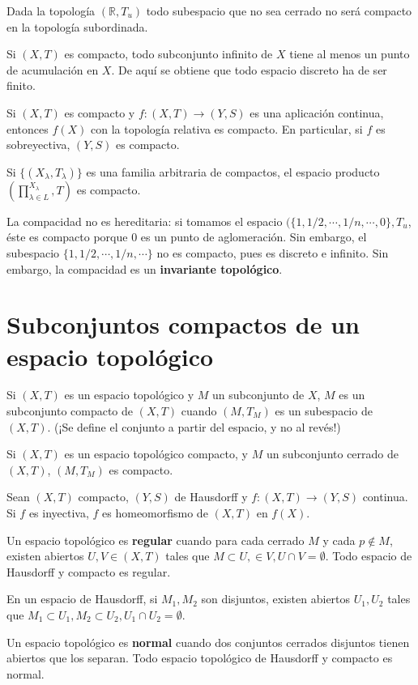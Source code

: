 \documentclass[a4paper, 11pt]{extarticle}
\begin{document}
Dada la topología \((\mathbb{R}, T_u)\) todo subespacio que no sea cerrado no
será compacto en la topología subordinada.

Si \((X,T)\) es compacto, todo subconjunto infinito de \(X\) tiene al menos
un punto de acumulación en \(X\). De aquí se obtiene que todo espacio discreto
ha de ser finito.

Si \((X,T)\) es compacto y \(f:  (X,T) \rightarrow  (Y, S)\) es una
aplicación continua, entonces \(f(X)\) con la topología relativa es compacto.
En particular, si \(f\) es sobreyectiva, \((Y,S)\) es compacto.

Si \(\{ (X_\lambda, T_\lambda) \}\) es una familia arbitraria de compactos, el
espacio producto \((\prod_{\lambda \in L}^{X_\lambda}, T)\) es compacto. 

La compacidad no es hereditaria: si tomamos el espacio \((\{ 1, 1/2, \cdots, 1/n,
\cdots, 0 \},T_u\), éste es compacto porque 0 es un punto de aglomeración. Sin
embargo, el subespacio \(\{ 1, 1/2, \cdots, 1/n, \cdots \}\) no es compacto,
pues es discreto e infinito. Sin embargo, la compacidad es un \textbf{invariante topológico}.

\section{Subconjuntos compactos de un espacio topológico}
\label{sec:orgcd52420}
Si \((X,T)\) es un espacio topológico y \(M\) un subconjunto de \(X\), \(M\) es un subconjunto compacto de \((X,T)\) cuando \((M, T_M)\) es un
subespacio de \((X,T)\). (¡Se define el conjunto a partir del espacio, y no al
revés!)

Si \((X,T)\) es un espacio topológico compacto, y \(M\) un subconjunto
cerrado de \((X,T)\), \((M, T_M)\) es compacto. 

Sean \((X,T)\) compacto, \((Y,S)\) de Hausdorff y \(f: (X,T) \rightarrow
(Y,S)\) continua. Si \(f\) es inyectiva, \(f\) es homeomorfismo de \((X,T)\) en \(f(X)\).

Un espacio topológico es \textbf{regular} cuando para cada cerrado \(M\) y cada \(p
\not \in M\), existen abiertos \(U,V \in (X,T)\) tales que \(M \subset U, 
\in V, U \cap V = \emptyset\). Todo espacio de Hausdorff y compacto es regular.

En un espacio de Hausdorff, si \(M_1, M_2\) son disjuntos, existen abiertos \(U_1, U_2\) tales que \(M_1 \subset U_1, M_2 \subset U_2, U_1 \cap U_2 =
\emptyset\). 

Un espacio topológico es \textbf{normal} cuando dos conjuntos cerrados disjuntos tienen
abiertos que los separan. Todo espacio topológico de Hausdorff y compacto es
normal.
\end{document}
